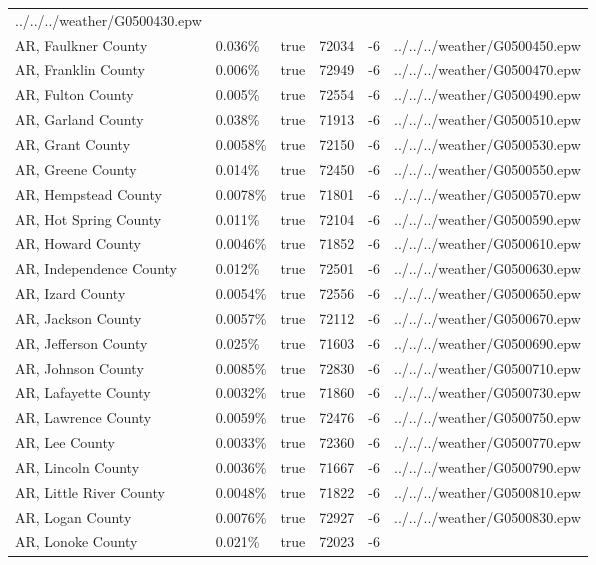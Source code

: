 \begin{longtable}[]{@{}llllll@{}}
../../../weather/G0500430.epw \\
AR, Faulkner County & 0.036\% & true & 72034 & -6 &
../../../weather/G0500450.epw \\
AR, Franklin County & 0.006\% & true & 72949 & -6 &
../../../weather/G0500470.epw \\
AR, Fulton County & 0.005\% & true & 72554 & -6 &
../../../weather/G0500490.epw \\
AR, Garland County & 0.038\% & true & 71913 & -6 &
../../../weather/G0500510.epw \\
AR, Grant County & 0.0058\% & true & 72150 & -6 &
../../../weather/G0500530.epw \\
AR, Greene County & 0.014\% & true & 72450 & -6 &
../../../weather/G0500550.epw \\
AR, Hempstead County & 0.0078\% & true & 71801 & -6 &
../../../weather/G0500570.epw \\
AR, Hot Spring County & 0.011\% & true & 72104 & -6 &
../../../weather/G0500590.epw \\
AR, Howard County & 0.0046\% & true & 71852 & -6 &
../../../weather/G0500610.epw \\
AR, Independence County & 0.012\% & true & 72501 & -6 &
../../../weather/G0500630.epw \\
AR, Izard County & 0.0054\% & true & 72556 & -6 &
../../../weather/G0500650.epw \\
AR, Jackson County & 0.0057\% & true & 72112 & -6 &
../../../weather/G0500670.epw \\
AR, Jefferson County & 0.025\% & true & 71603 & -6 &
../../../weather/G0500690.epw \\
AR, Johnson County & 0.0085\% & true & 72830 & -6 &
../../../weather/G0500710.epw \\
AR, Lafayette County & 0.0032\% & true & 71860 & -6 &
../../../weather/G0500730.epw \\
AR, Lawrence County & 0.0059\% & true & 72476 & -6 &
../../../weather/G0500750.epw \\
AR, Lee County & 0.0033\% & true & 72360 & -6 &
../../../weather/G0500770.epw \\
AR, Lincoln County & 0.0036\% & true & 71667 & -6 &
../../../weather/G0500790.epw \\
AR, Little River County & 0.0048\% & true & 71822 & -6 &
../../../weather/G0500810.epw \\
AR, Logan County & 0.0076\% & true & 72927 & -6 &
../../../weather/G0500830.epw \\
AR, Lonoke County & 0.021\% & true & 72023 & -6 &

\end{longtable}

